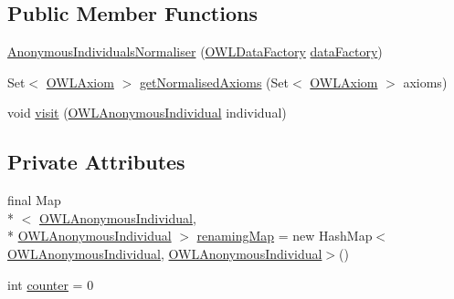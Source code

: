 \subsection*{Public Member Functions}
\begin{DoxyCompactItemize}
\item 
\hyperlink{classorg_1_1semanticweb_1_1owlapi_1_1api_1_1test_1_1anonymous_1_1_anonymous_individuals_normaliser_acad913c56a68f18418d133fed2fb2d46}{Anonymous\-Individuals\-Normaliser} (\hyperlink{interfaceorg_1_1semanticweb_1_1owlapi_1_1model_1_1_o_w_l_data_factory}{O\-W\-L\-Data\-Factory} \hyperlink{classorg_1_1semanticweb_1_1owlapi_1_1util_1_1_o_w_l_object_duplicator_a0b21efd4bc36ed4955d421aec99f4303}{data\-Factory})
\item 
Set$<$ \hyperlink{interfaceorg_1_1semanticweb_1_1owlapi_1_1model_1_1_o_w_l_axiom}{O\-W\-L\-Axiom} $>$ \hyperlink{classorg_1_1semanticweb_1_1owlapi_1_1api_1_1test_1_1anonymous_1_1_anonymous_individuals_normaliser_a223d1c170dd40d33f7e93b94de725611}{get\-Normalised\-Axioms} (Set$<$ \hyperlink{interfaceorg_1_1semanticweb_1_1owlapi_1_1model_1_1_o_w_l_axiom}{O\-W\-L\-Axiom} $>$ axioms)
\item 
void \hyperlink{classorg_1_1semanticweb_1_1owlapi_1_1api_1_1test_1_1anonymous_1_1_anonymous_individuals_normaliser_a22cfb656f8277bce0c20a07fde57cdc9}{visit} (\hyperlink{interfaceorg_1_1semanticweb_1_1owlapi_1_1model_1_1_o_w_l_anonymous_individual}{O\-W\-L\-Anonymous\-Individual} individual)
\end{DoxyCompactItemize}
\subsection*{Private Attributes}
\begin{DoxyCompactItemize}
\item 
final Map\\*
$<$ \hyperlink{interfaceorg_1_1semanticweb_1_1owlapi_1_1model_1_1_o_w_l_anonymous_individual}{O\-W\-L\-Anonymous\-Individual}, \\*
\hyperlink{interfaceorg_1_1semanticweb_1_1owlapi_1_1model_1_1_o_w_l_anonymous_individual}{O\-W\-L\-Anonymous\-Individual} $>$ \hyperlink{classorg_1_1semanticweb_1_1owlapi_1_1api_1_1test_1_1anonymous_1_1_anonymous_individuals_normaliser_ae07e6f0ba72ae6828e8829a5fa5044be}{renaming\-Map} = new Hash\-Map$<$\hyperlink{interfaceorg_1_1semanticweb_1_1owlapi_1_1model_1_1_o_w_l_anonymous_individual}{O\-W\-L\-Anonymous\-Individual}, \hyperlink{interfaceorg_1_1semanticweb_1_1owlapi_1_1model_1_1_o_w_l_anonymous_individual}{O\-W\-L\-Anonymous\-Individual}$>$()
\item 
int \hyperlink{classorg_1_1semanticweb_1_1owlapi_1_1api_1_1test_1_1anonymous_1_1_anonymous_individuals_normaliser_afd55304592af66f4fdff4df588568d06}{counter} = 0
\end{DoxyCompactItemize}
